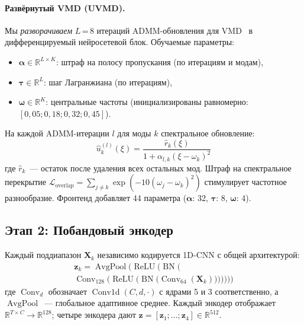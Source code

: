 \documentclass[conference]{IEEEtran}
\newcommand{\uvmd}{\textsc{UVMD}}
\begin{document}
\paragraph{Развёрнутый VMD (\uvmd{}).}
Мы \emph{разворачиваем} $L$\,=\,8 итераций ADMM-обновления для VMD~\cite{dragomiretskiy2014variational} в дифференцируемый нейросетевой блок.
Обучаемые параметры:
\begin{itemize}
    \item $\boldsymbol{\alpha} \in \mathbb{R}^{L \times K}$: штраф на полосу пропускания (по итерациям и модам),
    \item $\boldsymbol{\tau} \in \mathbb{R}^{L}$: шаг Лагранжиана (по итерациям),
    \item $\boldsymbol{\omega} \in \mathbb{R}^{K}$: центральные частоты (инициализированы равномерно: $[0{,}05; 0{,}18; 0{,}32; 0{,}45]$).
\end{itemize}
На каждой ADMM-итерации $l$ для моды $k$ спектральное обновление:
\begin{equation}
\hat{u}_k^{(l)}(\xi) = \frac{\hat{r}_k(\xi)}{1 + \alpha_{l,k} (\xi - \omega_k)^2}
\label{eq:uvmd}
\end{equation}
где $\hat{r}_k$~--- остаток после удаления всех остальных мод.
Штраф на спектральное перекрытие $\mathcal{L}_{\mathrm{overlap}} = \sum_{j \neq k} \exp(-10(\omega_j - \omega_k)^2)$ стимулирует частотное разнообразие.
Фронтенд добавляет 44 параметра ($\boldsymbol{\alpha}$: 32, $\boldsymbol{\tau}$: 8, $\boldsymbol{\omega}$: 4).

\subsection{Этап 2: Побандовый энкодер}
Каждый поддиапазон $\mathbf{X}_k$ независимо кодируется 1D-CNN с общей архитектурой:
\begin{multline}
\mathbf{z}_k = \operatorname{AvgPool}\!\big(\operatorname{ReLU}\!\big(\operatorname{BN}\!\big( \\
\operatorname{Conv}_{128}\!\big(\operatorname{ReLU}\!\big(\operatorname{BN}\!\big(\operatorname{Conv}_{64}(\mathbf{X}_k)\big)\big)\big)\big)\big)\big)
\end{multline}
где $\operatorname{Conv}_{d}$ обозначает $\operatorname{Conv1d}(C, d, \cdot)$ с ядрами 5 и 3 соответственно, а $\operatorname{AvgPool}$~--- глобальное адаптивное среднее.
Каждый энкодер отображает $\mathbb{R}^{T \times C} \to \mathbb{R}^{128}$; четыре энкодера дают $\mathbf{z} = [\mathbf{z}_1; \ldots; \mathbf{z}_4] \in \mathbb{R}^{512}$.
\end{document}

